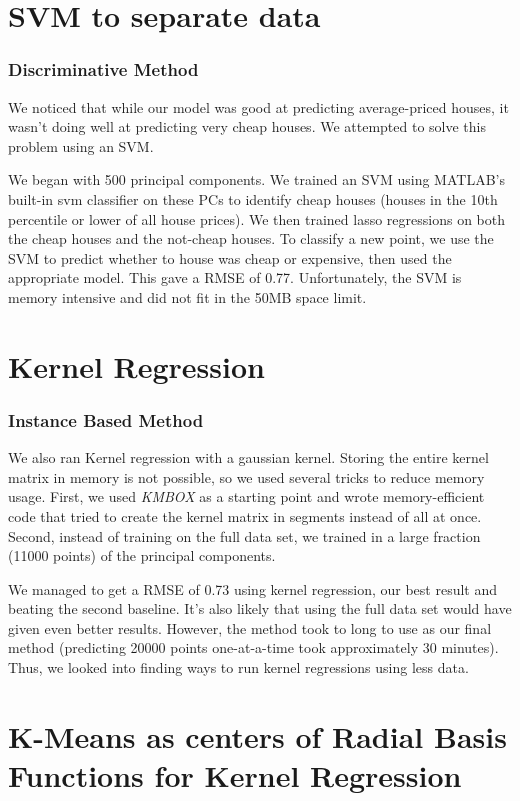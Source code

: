 \documentclass[a4paper,10pt]{article}
\begin{document}
\section{SVM to separate data}
\subsubsection*{Discriminative Method}
We noticed that while our model was good at predicting average-priced houses, it wasn't doing well at predicting very cheap houses. We attempted to solve this problem using an SVM.

We began with 500 principal components. We trained an SVM using MATLAB's built-in svm classifier on these PCs to identify cheap houses (houses in the 10th percentile or lower of all house prices). We then trained lasso regressions on both the cheap houses and the not-cheap houses. To classify a new point, we use the SVM to predict whether to house was cheap or expensive, then used the appropriate model. This gave a RMSE of 0.77. Unfortunately, the SVM is memory intensive and did not fit in the 50MB space limit.

\section{Kernel Regression}
\subsubsection*{Instance Based Method}
We also ran Kernel regression with a gaussian kernel. Storing the entire kernel matrix in memory is not possible, so we used several tricks to reduce memory usage. First, we used \emph{KMBOX} as a starting point and wrote memory-efficient code that tried to create the kernel matrix in segments instead of all at once. Second, instead of training on the full data set, we trained in a large fraction (11000 points) of the principal components.

We managed to get a RMSE of 0.73 using kernel regression, our best result and beating the second baseline. It's also likely that using the full data set would have given even better results. However, the method took to long to use as our final method (predicting 20000 points one-at-a-time took approximately 30 minutes). Thus, we looked into finding ways to run kernel regressions using less data.

\section{K-Means as centers of Radial Basis Functions for Kernel Regression}
\end{document}
